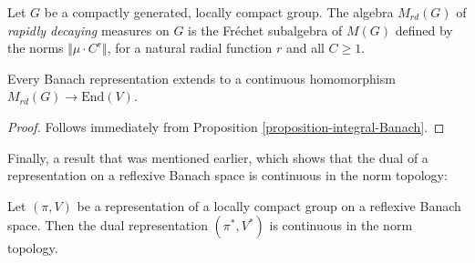 \begin{definition}
\label{definition-rapidly-decaying}
 Let $G$ be a compactly generated, locally compact group. The algebra $M_{rd}(G)$ of {\it rapidly decaying} measures on $G$ is the Fr\'echet subalgebra of $M(G)$ defined by the norms $\Vert \mu \cdot C^r\Vert$, for a natural radial function $r$ and all $C \ge 1$. 
\end{definition}

\begin{proposition}
\label{proposition-rapiddecay-Banach}
Every Banach representation extends to a continuous homomorphism $M_{rd}(G)\to \text{End}(V)$. 
\end{proposition}

\begin{proof}
 Follows immediately from Proposition \ref{proposition-integral-Banach}.
\end{proof}

Finally, a result that was mentioned earlier, which shows that the dual of a representation on a reflexive Banach space is continuous in the norm topology:

\begin{proposition}
 \label{proposition-reflexive-dual}
Let $(\pi,V)$ be a representation of a locally compact group on a reflexive Banach space. Then the dual representation $(\pi^*, V^*)$ is continuous in the norm topology. 
\end{proposition}

